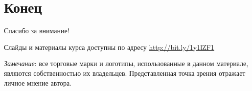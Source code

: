 \documentclass{beamer}
\begin{document}
\section{Конец}
\begin{frame}

{\huge{Спасибо за внимание!}\par}

\vfill

Слайды и материалы курса доступны по адресу \url{http://bit.ly/1y1lZF1} %

\vfill

\tiny{\textit{Замечание}: все торговые марки и логотипы, использованные в данном материале, являются собственностью их владельцев. Представленная точка зрения отражает личное мнение автора.
}

\end{frame}

\end{document}
